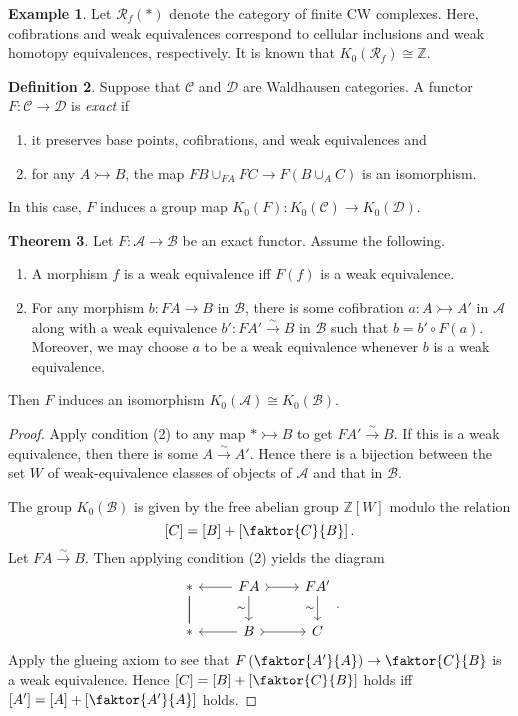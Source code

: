 \documentclass[10pt,letterpaper,cm]{nupset}
\theoremstyle{definition}
\newtheorem{definition}{Definition}[section]
\newtheorem{exmp}[definition]{Example}
\theoremstyle{theorem}
\newtheorem{theorem}[definition]{Theorem}
\theoremstyle{remark}
\newcommand{\Z}{\mathbb Z}
\newcommand{\1}{\mathbf{1}}
\renewcommand{\a}{\mathscr{A}}
\renewcommand{\b}{\mathscr{B}}
\renewcommand{\c}{\mathscr{C}}
\renewcommand{\d}{\mathscr{D}}
\newcommand{\0}{\vec 0}
\begin{document}
\begin{exmp}
Let $\mathcal{R}_f(\ast)$ denote the category of finite CW complexes. Here, cofibrations and weak equivalences correspond to cellular inclusions  and weak homotopy equivalences, respectively. It is known that $K_0(\mathcal{R}_f) \cong \Z$.
\end{exmp}

\begin{definition}
Suppose that $\c$ and $\d$ are Waldhausen categories. A functor $F: \c \to \d$ is \textit{exact} if
\begin{enumerate}[label=(\alph*)] 
\item it preserves base points, cofibrations, and weak equivalences and 
\item for any $A \rightarrowtail B$, the map $FB \cup_{FA} FC \to F(B\cup_A C)$ is an isomorphism. 
\end{enumerate}
\end{definition}

In this case, $F$ induces a group map $K_0(F) :K_0(\c) \to K_0(\d)$.

\begin{theorem}
Let $F : \a \to \b$ be an exact functor. Assume the following.
\begin{enumerate}[label=(\arabic*)]
\item A morphism $f$ is a weak equivalence iff $F(f)$ is a weak equivalence.
\item For any morphism $b : FA \to B$ in $\b$, there is some cofibration $a: A \rightarrowtail A'$ in $\a$ along with a weak equivalence $b' : FA' \overset{\sim}{\longrightarrow} B$ in $\b$ such that $b = b' \circ F(a)$. Moreover, we may choose $a$ to be a weak equivalence whenever $b$ is a weak equivalence.
\end{enumerate}
Then $F$ induces an isomorphism $K_0(\a) \cong K_0(\b)$.
\end{theorem}
\begin{proof}
Apply condition (2) to any map $\ast \rightarrowtail B$ to get $FA' \overset{\sim}{\longrightarrow} B$. If this is a weak equivalence, then there is some $A \overset{\sim}{\longrightarrow} A'$. Hence there is a bijection between the set $W$ of weak-equivalence classes of objects of $\a$ and that in $\b$. 

 The group $K_0(\b)$ is given by the free abelian group $\Z[W]$ modulo the relation $$[C] = [B] + \left[\faktor{C}{B}\right].$$ Let $FA \overset{\sim}{\longrightarrow}  B$. Then applying condition (2) yields the diagram
\[
\begin{tikzcd}
\ast \arrow[d, no head] \arrow[d, no head] & FA \arrow[d, "\sim"'] \arrow[r, tail] \arrow[l] & FA' \arrow[d, "\sim"'] \\
\ast & B \arrow[r, tail] \arrow[l] & C
\end{tikzcd}.
\]
Apply the glueing axiom to see that $F\left(\faktor{A'}{A}\right) \to \faktor{C}{B}$ is a weak equivalence. Hence $[C] = [B] + \left[\faktor{C}{B}\right]$
 holds iff $[A'] = [A] + \left[\faktor{A'}{A}\right]$ holds.
\end{proof}
\end{document}
